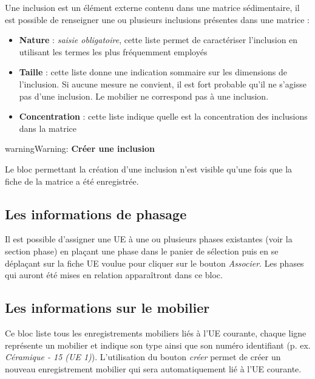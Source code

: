 \documentclass[letterpaper,10pt,french]{sphinxmanual}
\begin{document}
Une inclusion est un élément externe contenu dans une matrice sédimentaire, il est possible de renseigner une ou plusieurs inclusions présentes dans une matrice :
\begin{itemize}
\item {} 
\textbf{Nature} : \emph{saisie obligatoire}, cette liste permet de caractériser l'inclusion en utilisant les termes les plus fréquemment employés

\item {} 
\textbf{Taille} : cette liste donne une indication sommaire sur les dimensions de l'inclusion. Si aucune mesure ne convient, il est fort probable qu'il ne s'agisse pas d'une inclusion. Le mobilier ne correspond pas à une inclusion.

\item {} 
\textbf{Concentration} : cette liste indique quelle est la concentration des inclusions dans la matrice

\end{itemize}

\begin{notice}{warning}{Warning:}
\textbf{Créer une inclusion}

Le bloc permettant la création d'une inclusion n'est visible qu'une fois que la fiche de la matrice a été enregistrée.
\end{notice}


\subsection{Les informations de phasage}
\label{manuel/formulaire_ue:les-informations-de-phasage}
Il est possible d'assigner une UE à une ou plusieurs phases existantes (voir la section phase) en plaçant une phase dans le panier de sélection puis en se déplaçant sur la fiche UE voulue pour cliquer sur le bouton \emph{Associer}. Les phases qui auront été mises en relation apparaîtront dans ce bloc.


\subsection{Les informations sur le mobilier}
\label{manuel/formulaire_ue:les-informations-sur-le-mobilier}
Ce bloc liste tous les enregistrements mobiliers liés à l'UE courante, chaque ligne représente un mobilier et indique son type ainsi que son numéro identifiant (p. ex. \emph{Céramique - 15 (UE 1)}). L'utilisation du bouton \emph{créer} permet de créer un nouveau enregistrement mobilier qui sera automatiquement lié à l'UE courante.
\end{document}
